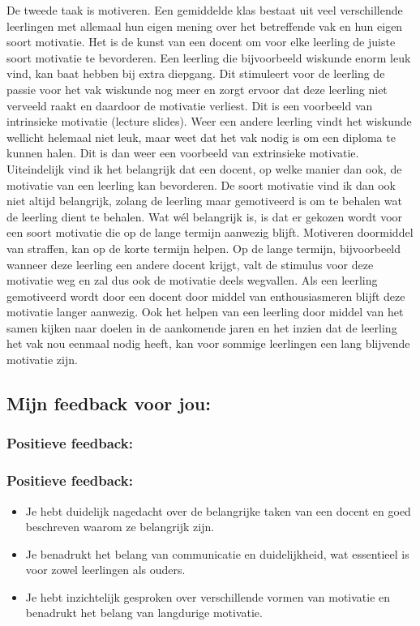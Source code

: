 \documentclass{article}
\begin{document}
{                De tweede taak is motiveren. Een gemiddelde klas bestaat uit veel verschillende leerlingen met allemaal hun eigen mening over het betreffende vak en hun eigen soort motivatie. Het is de kunst van een docent om voor elke leerling de juiste soort motivatie te bevorderen. Een leerling die bijvoorbeeld wiskunde enorm leuk vind, kan baat hebben bij extra diepgang. Dit stimuleert voor de leerling de passie voor het vak wiskunde nog meer en zorgt ervoor dat deze leerling niet verveeld raakt en daardoor de motivatie verliest. Dit is een voorbeeld van intrinsieke motivatie (lecture slides).
                Weer een andere leerling vindt het wiskunde wellicht helemaal niet leuk, maar weet dat het vak nodig is om een diploma te kunnen halen. Dit is dan weer een voorbeeld van extrinsieke motivatie. 
                Uiteindelijk vind ik het belangrijk dat een docent, op welke manier dan ook, de motivatie van een leerling kan bevorderen. De soort motivatie vind ik dan ook niet altijd belangrijk, zolang de leerling maar gemotiveerd is om te behalen wat de leerling dient te behalen. Wat wél belangrijk is, is dat er gekozen wordt voor een soort motivatie die op de lange termijn aanwezig blijft. Motiveren doormiddel van straffen, kan op de korte termijn helpen. Op de lange termijn, bijvoorbeeld wanneer deze leerling een andere docent krijgt, valt de stimulus voor deze motivatie weg en zal dus ook de motivatie deels wegvallen. Als een leerling gemotiveerd wordt door een docent door middel van enthousiasmeren blijft deze motivatie langer aanwezig. Ook het helpen van een leerling door middel van het samen kijken naar doelen in de aankomende jaren en het inzien dat de leerling het vak nou eenmaal nodig heeft, kan voor sommige leerlingen een lang blijvende motivatie zijn.}

        \bigskip

        \subsection*{Mijn feedback voor jou:}
            \subsubsection*{Positieve feedback:}
                \subsubsection*{Positieve feedback:}
                \begin{itemize}
                    \item Je hebt duidelijk nagedacht over de belangrijke taken van een docent en goed beschreven waarom ze belangrijk zijn.
                    \item Je benadrukt het belang van communicatie en duidelijkheid, wat essentieel is voor zowel leerlingen als ouders.
                    \item Je hebt inzichtelijk gesproken over verschillende vormen van motivatie en benadrukt het belang van langdurige motivatie.
                \end{itemize}
                \bigskip
\end{document}
